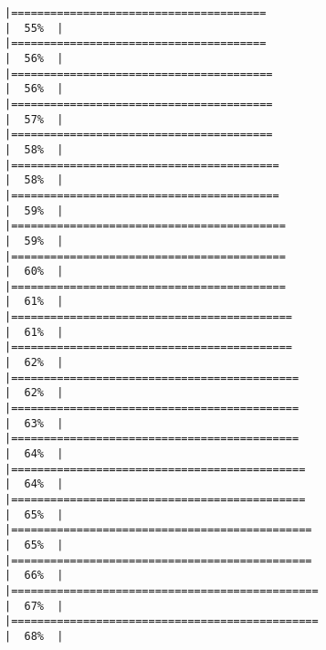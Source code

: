 \documentclass[
]{book}
\begin{document}
\begin{verbatim}
|=======================================                               |  55%  |                                                                              |=======================================                               |  56%  |                                                                              |========================================                              |  56%  |                                                                              |========================================                              |  57%  |                                                                              |========================================                              |  58%  |                                                                              |=========================================                             |  58%  |                                                                              |=========================================                             |  59%  |                                                                              |==========================================                            |  59%  |                                                                              |==========================================                            |  60%  |                                                                              |==========================================                            |  61%  |                                                                              |===========================================                           |  61%  |                                                                              |===========================================                           |  62%  |                                                                              |============================================                          |  62%  |                                                                              |============================================                          |  63%  |                                                                              |============================================                          |  64%  |                                                                              |=============================================                         |  64%  |                                                                              |=============================================                         |  65%  |                                                                              |==============================================                        |  65%  |                                                                              |==============================================                        |  66%  |                                                                              |===============================================                       |  67%  |                                                                              |===============================================                       |  68%  |                                                                              
\end{verbatim}
\end{document}
